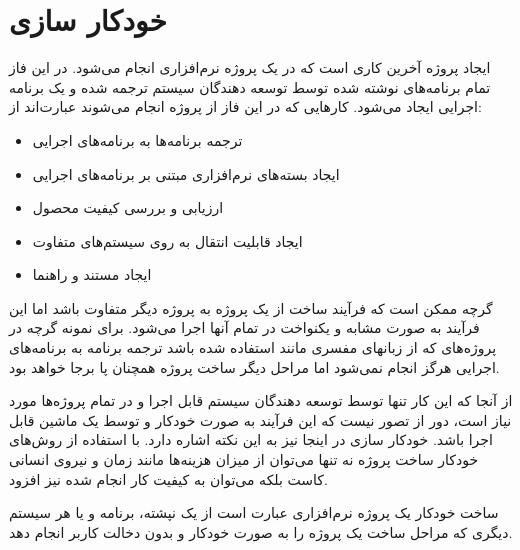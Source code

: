 %
% 
% 
% 
%
\chapter{خودکار سازی}

ایجاد پروژه آخرین کاری است که در یک پروژه نرم‌افزاری انجام می‌شود. در این  فاز
تمام برنامه‌های نوشته شده توسط توسعه دهندگان سیستم ترجمه شده و یک برنامه اجرایی
ایجاد می‌شود. کارهایی که در این فاز از پروژه انجام می‌شوند عبارت‌اند از:

\begin{itemize}
  \item ترجمه برنامه‌ها به برنامه‌های اجرایی
  \item ایجاد بسته‌های نرم‌افزاری مبتنی بر برنامه‌های اجرایی
  \item ارزیابی و بررسی کیفیت محصول
  \item ایجاد قابلیت انتقال به روی سیستم‌های متفاوت
  \item ایجاد مستند و راهنما
\end{itemize}

گرچه ممکن است که فرآیند ساخت از یک پروژه به پروژه دیگر متفاوت باشد اما این
فرآیند به صورت مشابه و یکنواخت در تمام آنها اجرا می‌شود. برای نمونه گرچه در
پروژه‌های که از زبانهای مفسری مانند  استفاده شده باشد ترجمه برنامه به
برنامه‌های اجرایی هرگز انجام نمی‌شود اما مراحل دیگر ساخت پروژه همچنان پا برجا
خواهد بود.

از آنجا که این کار تنها توسط توسعه دهندگان سیستم قابل اجرا و در تمام
پروژه‌ها مورد نیاز است، دور از تصور نیست که این فرآیند به صورت خودکار و توسط یک
ماشین قابل اجرا باشد. خودکار سازی در اینجا نیز به این نکته اشاره دارد. با
استفاده از روش‌های خودکار ساخت پروژه نه تنها می‌توان از میزان هزینه‌ها مانند
زمان و نیروی انسانی کاست بلکه می‌توان به کیفیت کار انجام شده نیز افزود.

ساخت خودکار یک پروژه نرم‌افزاری عبارت است از یک نپشته،
برنامه و یا هر سیستم دیگری که مراحل ساخت یک پروژه را به صورت خودکار و بدون دخالت
کاربر انجام دهد.
    
